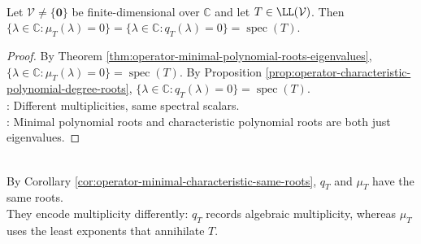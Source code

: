 \begin{corollary} \label{cor:operator-minimal-characteristic-same-roots} \\
Let $\mathcal{V}\neq\{\mathbf{0}\}$ be finite-dimensional over $\mathbb{C}$ and let $T\in\LL(\mathcal{V})$. Then $\{\lambda\in\mathbb{C}:\mu_T(\lambda)=0\} = \{\lambda\in\mathbb{C}:q_T(\lambda)=0\} = \operatorname{spec}(T)$.
\begin{proof}
By Theorem \ref{thm:operator-minimal-polynomial-roots-eigenvalues}, $\{\lambda\in\mathbb{C}:\mu_T(\lambda)=0\}=\operatorname{spec}(T)$. By Proposition \ref{prop:operator-characteristic-polynomial-degree-roots}, $\{\lambda\in\mathbb{C}:q_T(\lambda)=0\}=\operatorname{spec}(T)$.\\
: Different multiplicities, same spectral scalars.\\
: Minimal polynomial roots and characteristic polynomial roots are both just eigenvalues.
\end{proof}
\end{corollary}

\begin{perspective} \label{per:characteristic-versus-minimal-polynomial} \\
By Corollary \ref{cor:operator-minimal-characteristic-same-roots}, $q_T$ and $\mu_T$ have the same roots.\\
They encode multiplicity differently: $q_T$ records algebraic multiplicity, whereas $\mu_T$ uses the least exponents that annihilate $T$.
\end{perspective}
